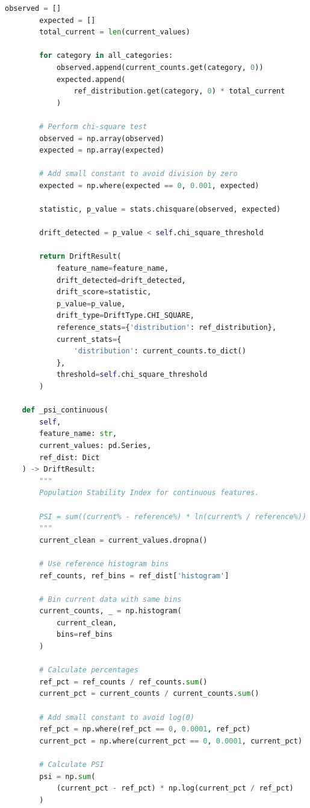 \begin{lstlisting}[language=Python, caption={Comprehensive Drift Detection System}]
        observed = []
        expected = []
        total_current = len(current_values)

        for category in all_categories:
            observed.append(current_counts.get(category, 0))
            expected.append(
                ref_distribution.get(category, 0) * total_current
            )

        # Perform chi-square test
        observed = np.array(observed)
        expected = np.array(expected)

        # Add small constant to avoid division by zero
        expected = np.where(expected == 0, 0.001, expected)

        statistic, p_value = stats.chisquare(observed, expected)

        drift_detected = p_value < self.chi_square_threshold

        return DriftResult(
            feature_name=feature_name,
            drift_detected=drift_detected,
            drift_score=statistic,
            p_value=p_value,
            drift_type=DriftType.CHI_SQUARE,
            reference_stats={'distribution': ref_distribution},
            current_stats={
                'distribution': current_counts.to_dict()
            },
            threshold=self.chi_square_threshold
        )

    def _psi_continuous(
        self,
        feature_name: str,
        current_values: pd.Series,
        ref_dist: Dict
    ) -> DriftResult:
        """
        Population Stability Index for continuous features.

        PSI = sum((current% - reference%) * ln(current% / reference%))
        """
        current_clean = current_values.dropna()

        # Use reference histogram bins
        ref_counts, ref_bins = ref_dist['histogram']

        # Bin current data with same bins
        current_counts, _ = np.histogram(
            current_clean,
            bins=ref_bins
        )

        # Calculate percentages
        ref_pct = ref_counts / ref_counts.sum()
        current_pct = current_counts / current_counts.sum()

        # Add small constant to avoid log(0)
        ref_pct = np.where(ref_pct == 0, 0.0001, ref_pct)
        current_pct = np.where(current_pct == 0, 0.0001, current_pct)

        # Calculate PSI
        psi = np.sum(
            (current_pct - ref_pct) * np.log(current_pct / ref_pct)
        )


\end{lstlisting}
